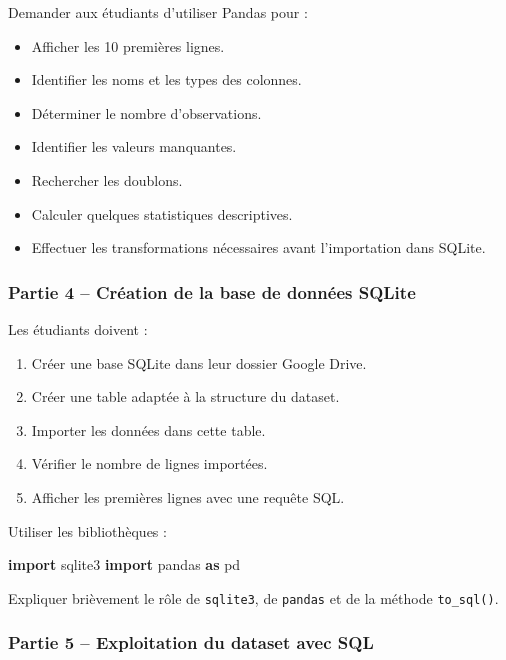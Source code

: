 \documentclass[
]{article}
\newenvironment{Shaded}{}{}
\newcommand{\ImportTok}[1]{\textcolor[rgb]{0.00,0.50,0.00}{\textbf{#1}}}
\newcommand{\NormalTok}[1]{#1}
\providecommand{\tightlist}{%
  \setlength{\itemsep}{0pt}\setlength{\parskip}{0pt}}
\begin{document}
Demander aux étudiants d'utiliser Pandas pour :

\begin{itemize}
\tightlist
\item
  Afficher les 10 premières lignes.
\item
  Identifier les noms et les types des colonnes.
\item
  Déterminer le nombre d'observations.
\item
  Identifier les valeurs manquantes.
\item
  Rechercher les doublons.
\item
  Calculer quelques statistiques descriptives.
\item
  Effectuer les transformations nécessaires avant l'importation dans
  SQLite.
\end{itemize}

\subsubsection{Partie 4 -- Création de la base de données
SQLite}\label{partie-4-cruxe9ation-de-la-base-de-donnuxe9es-sqlite}

Les étudiants doivent :

\begin{enumerate}
\def\labelenumi{\arabic{enumi}.}
\tightlist
\item
  Créer une base SQLite dans leur dossier Google Drive.
\item
  Créer une table adaptée à la structure du dataset.
\item
  Importer les données dans cette table.
\item
  Vérifier le nombre de lignes importées.
\item
  Afficher les premières lignes avec une requête SQL.
\end{enumerate}

Utiliser les bibliothèques :

\begin{Shaded}
\begin{Highlighting}[]
\ImportTok{import}\NormalTok{ sqlite3}
\ImportTok{import}\NormalTok{ pandas }\ImportTok{as}\NormalTok{ pd}
\end{Highlighting}
\end{Shaded}

Expliquer brièvement le rôle de \texttt{sqlite3}, de \texttt{pandas} et
de la méthode \texttt{to\_sql()}.

\subsubsection{Partie 5 -- Exploitation du dataset avec
SQL}\label{partie-5-exploitation-du-dataset-avec-sql}
\end{document}

